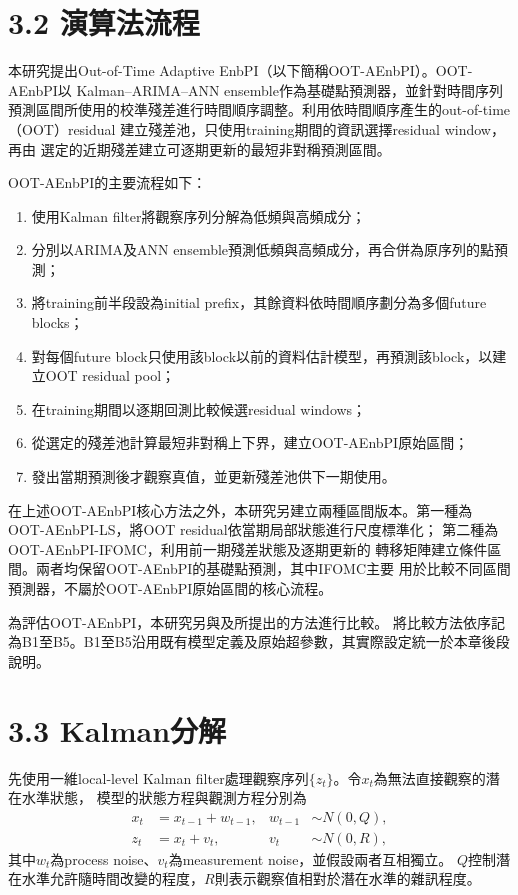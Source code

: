 \section*{3.2 演算法流程}

本研究提出Out-of-Time Adaptive EnbPI（以下簡稱OOT-AEnbPI）。OOT-AEnbPI以
Kalman--ARIMA--ANN ensemble作為基礎點預測器，並針對時間序列
預測區間所使用的校準殘差進行時間順序調整。利用依時間順序產生的out-of-time（OOT）residual
建立殘差池，只使用training期間的資訊選擇residual window，再由
選定的近期殘差建立可逐期更新的最短非對稱預測區間。

OOT-AEnbPI的主要流程如下：
\begin{enumerate}
  \item 使用Kalman filter將觀察序列分解為低頻與高頻成分；
  \item 分別以ARIMA及ANN ensemble預測低頻與高頻成分，再合併為原序列的點預測；
  \item 將training前半段設為initial prefix，其餘資料依時間順序劃分為多個future blocks；
  \item 對每個future block只使用該block以前的資料估計模型，再預測該block，以建立OOT residual pool；
  \item 在training期間以逐期回測比較候選residual windows；
  \item 從選定的殘差池計算最短非對稱上下界，建立OOT-AEnbPI原始區間；
  \item 發出當期預測後才觀察真值，並更新殘差池供下一期使用。
\end{enumerate}

在上述OOT-AEnbPI核心方法之外，本研究另建立兩種區間版本。第一種為
OOT-AEnbPI-LS，將OOT residual依當期局部狀態進行尺度標準化；
第二種為OOT-AEnbPI-IFOMC，利用前一期殘差狀態及逐期更新的
轉移矩陣建立條件區間。兩者均保留OOT-AEnbPI的基礎點預測，其中IFOMC主要
用於比較不同區間預測器，不屬於OOT-AEnbPI原始區間的核心流程。

為評估OOT-AEnbPI，本研究另與\cite{hung2026thesis}及\cite{lin2024thesis}所提出的方法進行比較。
將比較方法依序記為B1至B5。B1至B5沿用既有模型定義及原始超參數，其實際設定統一於本章後段說明。

\section*{3.3 Kalman分解}

先使用一維local-level Kalman filter處理觀察序列$\{z_t\}$。令$x_t$為無法直接觀察的潛在水準狀態，
模型的狀態方程與觀測方程分別為
\begin{align}
  x_t &= x_{t-1}+w_{t-1}, & w_{t-1}&\sim N(0,Q),\\
  z_t &= x_t+v_t, & v_t&\sim N(0,R),
\end{align}
其中$w_t$為process noise、$v_t$為measurement noise，並假設兩者互相獨立。
$Q$控制潛在水準允許隨時間改變的程度，$R$則表示觀察值相對於潛在水準的雜訊程度。

